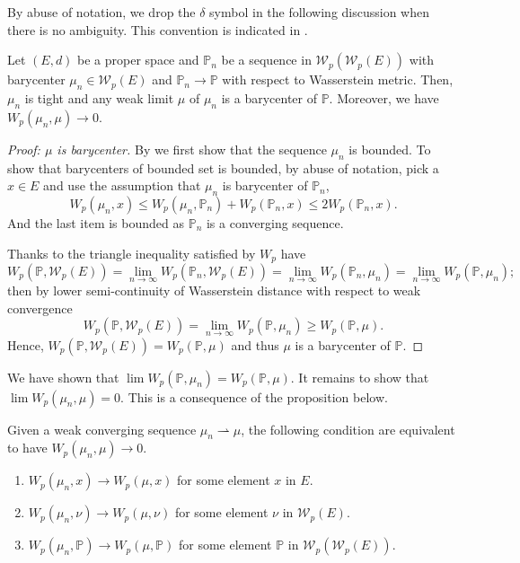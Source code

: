 By abuse of notation, we drop the $\delta$ symbol in the following discussion when there is no ambiguity.
This convention is indicated in .
\begin{thm}
	\label{thm:consistency_barycenter_Wasserstein}
	Let $(E,d)$ be a proper space and $\mathbb{P}_n$  be a sequence in $\mathcal{W}_p(\mathcal{W}_p(E))$
	with barycenter $\mu_n \in \mathcal{W}_p(E)$ and $\mathbb{P}_n \rightarrow \mathbb{P}$ with respect to Wasserstein metric.
	Then, $\mu_n$ is tight and any weak limit $\mu$ of $\mu_n$ is a barycenter of $\mathbb{P}$.
	Moreover, we have $W_p(\mu_n, \mu) \rightarrow 0$.
\end{thm}

\begin{proof}[Proof: $\mu$ is barycenter]
	By  we first show that the sequence $\mu_n$ is bounded.
	To show that barycenters of bounded set is bounded, by abuse of notation,
	pick a $x \in E$ and use the assumption that $\mu_n$ is barycenter of $\mathbb{P}_n$,
	\[
		W_p(\mu_n, x) \leq W_p(\mu_n, \mathbb{P}_n)  + W_p(\mathbb{P}_n, x) \leq 2 W_p(\mathbb{P}_n , x).
	\]
	And the last item is bounded as $\mathbb{P}_n$ is a converging sequence.

	Thanks to the triangle inequality satisfied by $W_p$ have
	\[
		W_p(\mathbb{P}, \mathcal{W}_p(E)) =
		\lim_{n \rightarrow \infty}W_p(\mathbb{P}_n, \mathcal{W}_p(E))=\lim_{n \rightarrow \infty}W_p(\mathbb{P}_n, \mu_n)
		= \lim_{n \rightarrow \infty}W_p(\mathbb{P}, \mu_n);
	\]
	then by lower semi-continuity of Wasserstein distance with respect to weak convergence
	\[
		W_p(\mathbb{P}, \mathcal{W}_p(E)) =
		\lim_{n \rightarrow \infty}W_p(\mathbb{P}, \mu_n)
		\geq W_p(\mathbb{P}, \mu).
	\]
	Hence, $W_p(\mathbb{P}, \mathcal{W}_p(E)) =W_p(\mathbb{P}, \mu)$ and thus $\mu$ is a barycenter of $\mathbb{P}$.
\end{proof}

We have shown that $ \lim W_p(\mathbb{P}, \mu_n) = W_p(\mathbb{P}, \mu)$.
It remains to show that $\lim W_p(\mu_n, \mu) = 0$.
This is a consequence of the proposition below.

\begin{prop}
	Given a weak converging sequence $\mu_n \rightharpoonup \mu$,
	the following condition are equivalent to have $W_p(\mu_n, \mu) \rightarrow 0$.
	\begin{enumerate}
		\item $W_p(\mu_n, x) \rightarrow W_p(\mu, x)$ for some element $x$ in $E$.
		\item $W_p(\mu_n, \nu) \rightarrow W_p(\mu, \nu)$ for some element $\nu$ in $\mathcal{W}_p(E)$.
		\item $W_p(\mu_n, \mathbb{P}) \rightarrow W_p(\mu, \mathbb{P})$ for some element $\mathbb{P}$ in $\mathcal{W}_p(\mathcal{W}_p(E))$.
	\end{enumerate}
\end{prop}

